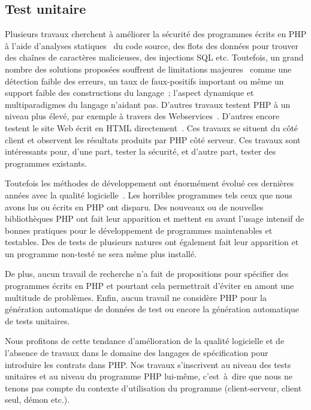 \subsection{Test unitaire}

Plusieurs travaux cherchent à améliorer la sécurité des programmes écrits en PHP
à l'aide d'analyses statiques~ du code source, des flots des données pour trouver des
chaînes de caractères malicieuses, des injections SQL etc. Toutefois, un grand
nombre des solutions proposées souffrent de limitations
majeures~ comme une détection faible des erreurs, un taux de
faux-positifs important ou même un support faible des constructions du langage~;
l'aspect dynamique et multiparadigmes du langage n'aidant pas. D'autres travaux
testent PHP à un niveau plus élevé, par exemple à travers des
Webservices~\acite{}. D'autres encore testent le site Web écrit en HTML
directement~. Ces
travaux se situent du côté client et observent les résultats produits par PHP
côté serveur. Ces travaux sont intéressants pour, d'une part, tester la
sécurité, et d'autre part, tester des programmes existants.

Toutefois les méthodes de développement ont énormément évolué ces dernières
années avec la qualité logicielle~. Les horribles programmes
tels ceux que nous avons lus ou écrits en PHP ont disparu. Des nouveaux
 ou de nouvelles bibliothèques PHP ont fait leur
apparition et mettent en avant l'usage intensif de bonnes pratiques pour le
développement de programmes maintenables et testables. Des
 de tests de plusieurs natures ont également fait leur
apparition et un programme non-testé ne sera même plus installé. 

De plus, aucun travail de recherche n'a fait de propositions pour spécifier des
programmes écrits en PHP et pourtant cela permettrait d'éviter en amont une
multitude de problèmes. Enfin, aucun travail ne considère PHP pour la génération
automatique de données de test ou encore la génération automatique de tests
unitaires.

Nous profitons de cette tendance d'amélioration de la qualité logicielle et de
l'absence de travaux dans le domaine des langages de spécification pour
introduire les contrats dans PHP. Nos travaux s'inscrivent au niveau des tests
unitaires et au niveau du programme PHP lui-même, c'est~à~dire que nous ne
tenons pas compte du contexte d'utilisation du programme (client-serveur, client
seul, démon etc.).

